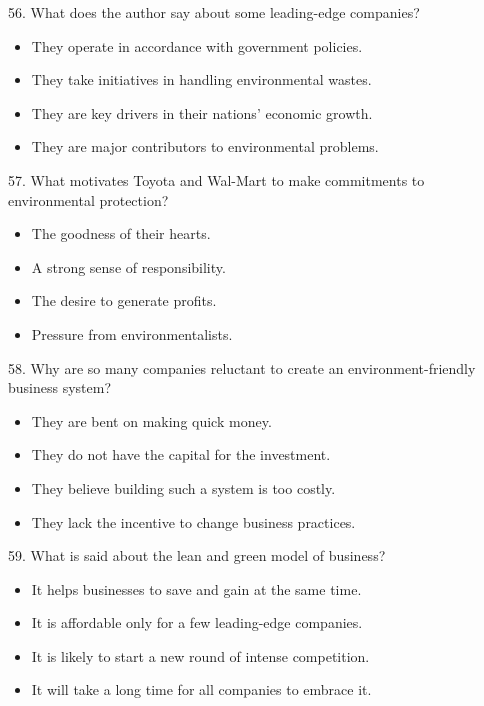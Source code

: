 \documentclass[UTF8,11pt]{ctexart}
\begin{document}
56. What does the author say about some leading-edge companies?


\begin{itemize}[leftmargin=2em,itemsep=.2em,topsep=.4em]\item[A.] They operate in accordance with government policies.
\item[B.] They take initiatives in handling environmental wastes.
\item[C.] They are key drivers in their nations' economic growth.
\item[D.] They are major contributors to environmental problems.
\end{itemize}

57. What motivates Toyota and Wal-Mart to make commitments to environmental protection?


\begin{itemize}[leftmargin=2em,itemsep=.2em,topsep=.4em]\item[A.] The goodness of their hearts.
\item[B.] A strong sense of responsibility.
\item[C.] The desire to generate profits.
\item[D.] Pressure from environmentalists.
\end{itemize}

58. Why are so many companies reluctant to create an environment-friendly business system?


\begin{itemize}[leftmargin=2em,itemsep=.2em,topsep=.4em]\item[A.] They are bent on making quick money.
\item[B.] They do not have the capital for the investment.
\item[C.] They believe building such a system is too costly.
\item[D.] They lack the incentive to change business practices.
\end{itemize}

59. What is said about the lean and green model of business?


\begin{itemize}[leftmargin=2em,itemsep=.2em,topsep=.4em]\item[A.] It helps businesses to save and gain at the same time.
\item[B.] It is affordable only for a few leading-edge companies.
\item[C.] It is likely to start a new round of intense competition.
\item[D.] It will take a long time for all companies to embrace it.
\end{itemize}
\end{document}
